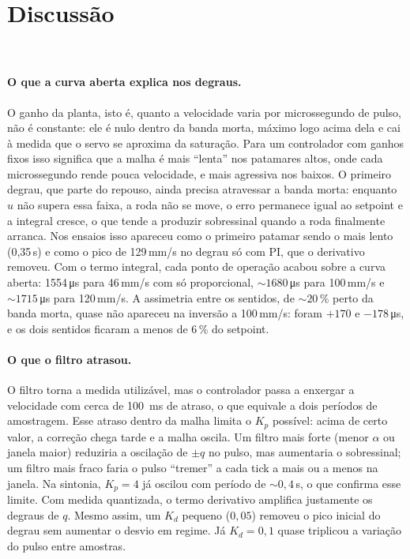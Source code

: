 \documentclass[12pt]{article}
\begin{document}
\section{Discussão}\

\paragraph{O que a curva aberta explica nos degraus.} O ganho da planta, isto é, quanto a velocidade varia por microssegundo de pulso, não é constante: ele é nulo dentro da banda morta, máximo logo acima dela e cai à medida que o servo se aproxima da saturação. Para um controlador com ganhos fixos isso significa que a malha é mais ``lenta'' nos patamares altos, onde cada microssegundo rende pouca velocidade, e mais agressiva nos baixos. O primeiro degrau, que parte do repouso, ainda precisa atravessar a banda morta: enquanto $u$ não supera essa faixa, a roda não se move, o erro permanece igual ao setpoint e a integral cresce, o que tende a produzir sobressinal quando a roda finalmente arranca. Nos ensaios isso apareceu como o primeiro patamar sendo o mais lento (0,35\,s) e como o pico de 129\,mm/s no degrau só com PI, que o derivativo removeu. Com o termo integral, cada ponto de operação acabou sobre a curva aberta: 1554\,\si{\micro\second} para 46\,mm/s com só proporcional, ${\sim}1680$\,\si{\micro\second} para 100\,mm/s e ${\sim}1715$\,\si{\micro\second} para 120\,mm/s. A assimetria entre os sentidos, de ${\sim}20\,\%$ perto da banda morta, quase não apareceu na inversão a 100\,mm/s: foram $+170$ e $-178$\,\si{\micro\second}, e os dois sentidos ficaram a menos de 6\,\% do setpoint.

\paragraph{O que o filtro atrasou.} O filtro torna a medida utilizável, mas o controlador passa a enxergar a velocidade com cerca de \SI{100}{\milli\second} de atraso, o que equivale a dois períodos de amostragem. Esse atraso dentro da malha limita o $K_p$ possível: acima de certo valor, a correção chega tarde e a malha oscila. Um filtro mais forte (menor $\alpha$ ou janela maior) reduziria a oscilação de $\pm q$ no pulso, mas aumentaria o sobressinal; um filtro mais fraco faria o pulso ``tremer'' a cada tick a mais ou a menos na janela. Na sintonia, $K_p = 4$ já oscilou com período de ${\sim}0{,}4$\,s, o que confirma esse limite. Com medida quantizada, o termo derivativo amplifica justamente os degraus de $q$. Mesmo assim, um $K_d$ pequeno ($0{,}05$) removeu o pico inicial do degrau sem aumentar o desvio em regime. Já $K_d = 0{,}1$ quase triplicou a variação do pulso entre amostras.
\end{document}
